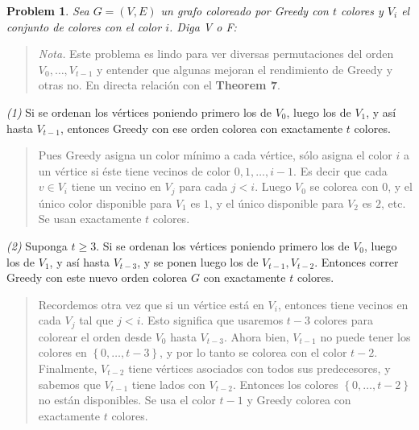 \documentclass[a4paper, 12pt]{article}
\newtheorem{problem}{Problem}
\newtheorem{problem}{Problem}
\begin{document}
\pagebreak 

\begin{problem}
    Sea $G = (V, E) $ un grafo coloreado por Greedy con $t$ colores y $V_i$ el
    conjunto de colores con el color $i$. Diga V o F:
\end{problem}


\small
\begin{quote}

\textit{Nota.} Este problema es lindo para ver diversas permutaciones del orden
$V_0, \ldots, V_{t - 1}$ y entender que algunas mejoran el rendimiento de Greedy
y otras no. En directa relación con el \textbf{Theorem 7}.

\end{quote}
\normalsize


\textit{(1)} Si se ordenan los vértices poniendo primero los de $V_0$, luego los
de $V_1$, y así hasta $V_{t-1}$, entonces Greedy con ese orden colorea con
exactamente $t$ colores. 

\small
\begin{quote}
    Pues Greedy asigna un color mínimo a cada vértice, sólo asigna el color $i$
    a un vértice si éste tiene vecinos de color $0, 1, \ldots, i -1$. Es decir
    que cada $v \in V_i$ tiene un vecino en $V_j$ para cada $j < i$. Luego $V_0$
    se colorea con $0$, y el único color disponible para $V_1$ es $1$, y el
    único disponible para $V_2$ es $2$, etc. Se usan exactamente $t$ colores.
\end{quote}


\textit{(2)} Suponga $t \geq 3$. Si se ordenan los vértices poniendo primero los
de $V_0$, luego los de $V_1$, y así hasta $V_{t - 3}$, y se ponen luego los de
$V_{t - 1}, V_{t-2}$. Entonces correr Greedy con este nuevo orden colorea $G$
con exactamente $t$ colores.


\small
\begin{quote}

    Recordemos otra vez que si un vértice está en $V_i$, entonces tiene vecinos
    en cada $V_{j}$ tal que $j < i$. Esto significa que usaremos $t - 3$ colores
    para colorear el orden desde $V_0$ hasta $V_{t - 3}$. Ahora bien, $V_{t -
    1}$ no puede tener los colores en $\left\{ 0, \ldots, t - 3 \right\} $, y
    por lo tanto se colorea con el color $t - 2$. Finalmente, $V_{t - 2}$ tiene
    vértices asociados con todos sus predecesores, y sabemos que $V_{t - 1}$
    tiene lados con $V_{t - 2}$. Entonces los colores $\left\{ 0, \ldots, t - 2
    \right\} $ no están disponibles. Se usa el color $t - 1$ y Greedy colorea
    con exactamente $t$ colores.

\end{quote}
\normalsize
\end{document}
